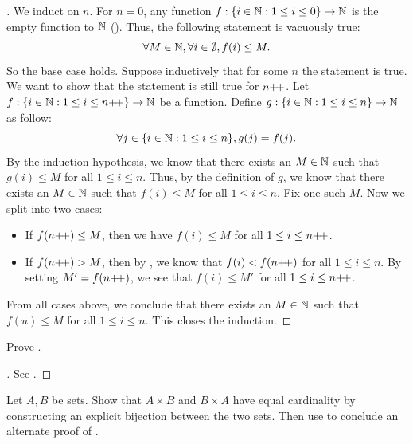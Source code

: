 \begin{proof}[]
  We induct on \(n\).
  For \(n = 0\), any function \(f : \left\lbrace i \in \mathbb{N} : 1 \leq i \leq 0\right\rbrace \to \mathbb{N}\) is the empty function to \(\mathbb{N}\) ().
  Thus, the following statement is vacuously true:
  \[
    \forall M \in \mathbb{N}, \forall i \in \emptyset, f(i) \leq M.
  \]
  So the base case holds.
  Suppose inductively that for some \(n\) the statement is true.
  We want to show that the statement is still true for \(n{+}\!{+}\).
  Let \(f : \left\lbrace i \in \mathbb{N} : 1 \leq i \leq n{+}\!{+}\right\rbrace \to \mathbb{N}\) be a function.
  Define \(g : \left\lbrace i \in \mathbb{N} : 1 \leq i \leq n\right\rbrace \to \mathbb{N}\) as follow:
  \[
    \forall j \in \set{i \in \N : 1 \leq i \leq n}, g(j) = f(j).
  \]
  By the induction hypothesis, we know that there exists an \(M \in \mathbb{N}\) such that \(g(i) \leq M\) for all \(1 \leq i \leq n\).
  Thus, by the definition of \(g\), we know that there exists an \(M \in \mathbb{N}\) such that \(f(i) \leq M\) for all \(1 \leq i \leq n\).
  Fix one such \(M\).
  Now we split into two cases:
  \begin{itemize}
    \item If \(f(n{+}\!{+}) \leq M\), then we have \(f(i) \leq M\) for all \(1 \leq i \leq n{+}\!{+}\).
    \item If \(f(n{+}\!{+}) > M\), then by , we know that \(f(i) < f(n{+}\!{+})\) for all \(1 \leq i \leq n\).
          By setting \(M' = f(n{+}\!{+})\), we see that \(f(i) \leq M'\) for all \(1 \leq i \leq n{+}\!{+}\).
  \end{itemize}
  From all cases above, we conclude that there exists an \(M \in \mathbb{N}\) such that \(f(u) \leq M\) for all \(1 \leq i \leq n\).
  This closes the induction.
\end{proof}

\begin{ex}\label{i:ex:3.6.4}
  Prove .
\end{ex}

\begin{proof}[]
  See .
\end{proof}

\begin{ex}\label{i:ex:3.6.5}
  Let \(A, B\) be sets.
  Show that \(A \times B\) and \(B \times A\) have equal cardinality by constructing an explicit bijection between the two sets.
  Then use  to conclude an alternate proof of .
\end{ex}

